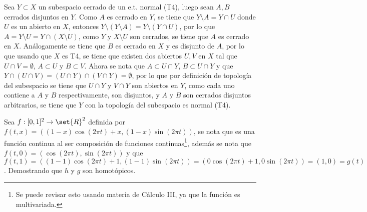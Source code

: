\documentclass{homework}
\begin{document}
\begin{sol}
    Sea \(Y\subset X\) un subespacio cerrado de un e.t. normal (T4), luego sean \(A,B\) cerrados disjuntos en \(Y\). Como \(A\) es cerrado en \(Y\), se tiene que \(Y\setminus A=Y\cap U\) donde \(U\) es un abierto en \(X\), entonces \(Y\setminus(Y\setminus A)=Y\setminus(Y\cap U)\), por lo que \(A=Y\setminus U=Y\cap (X\setminus U)\), como \(Y\) y \(X\setminus U\) son cerrados, se tiene que \(A\) es cerrado en \(X\). Análogamente se tiene que \(B\) es cerrado en \(X\) y es disjunto de \(A\), por lo que usando que \(X\) es T4, se tiene que existen dos abiertos \(U,V\) en \(X\) tal que \(U\cap V=\emptyset\), \(A\subset U\) y \(B\subset V\). Ahora se nota que \(A\subset U\cap Y\), \(B\subset U\cap Y\) y que \(Y\cap(U\cap V)=(U\cap Y)\cap(V\cap Y)=\emptyset\), por lo que por definición de topología del subespacio se tiene que \(U\cap Y\) y \(V\cap Y\) son abiertos en \(Y\), como cada uno contiene a \(A\) y \(B\) respectivamente, son disjuntos, y \(A\) y \(B\) son cerrados disjuntos arbitrarios, se tiene que \(Y\) con la topología del subespacio es normal (T4).
\end{sol}

\begin{sol}
    Sea \(f:[0,1]^2\rightarrow\set{R}^2\) definida por \(f(t,x)=((1-x)\cos(2\pi t)+x,(1-x)\sin(2\pi t))\), se nota que es una función continua al ser composición de funciones continuas\footnote{Se puede revisar esto usando materia de Cálculo III, ya que la función es multivariada.}, además se nota que \(f(t,0)=(\cos(2\pi t),\sin(2\pi t))\) y que \(f(t,1)=((1-1)\cos(2\pi t)+1,(1-1)\sin(2\pi t))=(0\cos(2\pi t)+1,0\sin(2\pi t))=(1,0)=g(t)\). Demostrando que \(h\) y \(g\) son homotópicos.
\end{sol}
\end{document}
